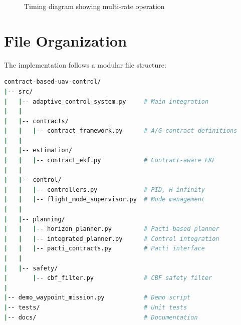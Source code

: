 \begin{figure}[htbp]
    \centering
    \caption{Timing diagram showing multi-rate operation}
    \label{fig:timing}
\end{figure}

\section{File Organization}

The implementation follows a modular file structure:

\begin{lstlisting}[language=bash, caption={Project directory structure}]
contract-based-uav-control/
|-- src/
|   |-- adaptive_control_system.py     # Main integration
|   |
|   |-- contracts/
|   |   |-- contract_framework.py      # A/G contract definitions
|   |
|   |-- estimation/
|   |   |-- contract_ekf.py            # Contract-aware EKF
|   |
|   |-- control/
|   |   |-- controllers.py             # PID, H-infinity
|   |   |-- flight_mode_supervisor.py  # Mode management
|   |
|   |-- planning/
|   |   |-- horizon_planner.py         # Pacti-based planner
|   |   |-- integrated_planner.py      # Control integration
|   |   |-- pacti_contracts.py         # Pacti interface
|   |
|   |-- safety/
|       |-- cbf_filter.py              # CBF safety filter
|
|-- demo_waypoint_mission.py           # Demo script
|-- tests/                             # Unit tests
|-- docs/                              # Documentation
\end{lstlisting}
